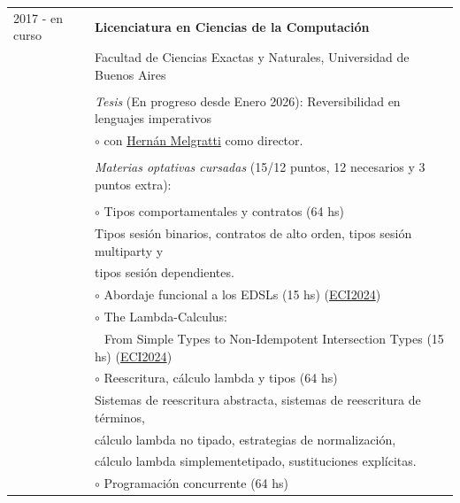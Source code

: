 \documentclass{article}
\newcommand{\shade}[1]{\textcolor{myGray}{#1}}
\begin{document}
\begin{longtable}{l l}
    2017 - en curso  & \textbf{Licenciatura en Ciencias de la Computación}\\
                  & Facultad de Ciencias Exactas y Naturales, Universidad de Buenos Aires \\
					\\
                    & \textit{Tesis} \shade{(En progreso desde Enero 2026)}: Reversibilidad en lenguajes imperativos \\
                    & \indent $\circ$ con \href{https://dblp.org/pid/24/2104.html}{Hernán Melgratti} como director. \\
					\\
                    & \textit{Materias optativas cursadas\footnotemark[1]} (15/12 puntos, 12 necesarios y 3 puntos extra): \\
                    \\
                    & $\circ$ Tipos comportamentales y contratos \shade{(64 hs)} \\
                    & \indent \shade{Tipos sesión binarios, contratos de alto orden, tipos sesión multiparty y} \\
                    & \indent \shade{tipos sesión dependientes.} \\
                    & $\circ$ Abordaje funcional a los EDSLs \shade{(15 hs)} \hfill \shade{(\href{https://eci.dc.uba.ar/ecis-anteriores/eci2024/}{ECI2024})} \\
                    & $\circ$ The Lambda-Calculus: \\
                    & $~~$ From Simple Types to Non-Idempotent Intersection Types \shade{(15 hs)} \hfill \shade{(\href{https://eci.dc.uba.ar/ecis-anteriores/eci2024/}{ECI2024})} \\
                    & $\circ$ Reescritura, cálculo lambda y tipos \shade{(64 hs)} \\
                    & \indent \shade{Sistemas de reescritura abstracta, sistemas de reescritura de términos,} \\
                    & \indent \shade{cálculo lambda no tipado, estrategias de normalización,} \\
                    & \indent \shade{cálculo lambda simplementetipado, sustituciones explícitas.} \\
                    & $\circ$ Programación concurrente \shade{(64 hs)} \\

\end{longtable}
\end{document}
